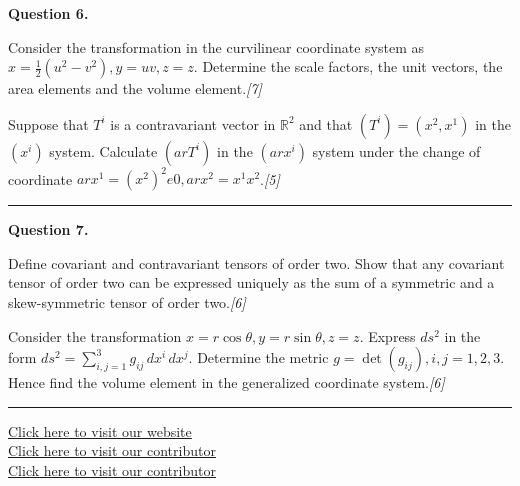 \documentclass[11pt,a4paper]{article}
\newcommand{\pts}[1]{\hfill   \textit{[#1]}}
\begin{document}
\medskip


\noindent   \textbf{Question 6.}

\begin{parts}
  \item Consider the transformation in the curvilinear coordinate system as $x = \frac{1}{2}(u^2-v^2), y=uv, z=z$. Determine the scale factors, the unit vectors, the area elements and the volume element.\pts{7}
  \item Suppose that $T^i$ is a contravariant vector in $\mathbb{R}^2$ and that $(T^i) = (x^2, x^1)$ in the $(x^i)$ system. Calculate $(ar{T}^i)$ in the $(ar{x}^i)$ system under the change of coordinate $ar{x}^1 = (x^2)^2 
e 0, ar{x}^2 = x^1 x^2$.\pts{5}
\end{parts}
\medskip\rule{\linewidth}{0.2pt}

\medskip


\noindent   \textbf{Question 7.}

\begin{parts}
  \item Define covariant and contravariant tensors of order two. Show that any covariant tensor of order two can be expressed uniquely as the sum of a symmetric and a skew-symmetric tensor of order two.\pts{6}
  \item Consider the transformation $x=r\cos \theta, y=r\sin \theta, z=z$. Express $ds^2$ in the form $ds^2 = \sum_{i,j=1}^3 g_{ij}\,dx^i\,dx^j$. Determine the metric $g = \det(g_{ij}), i,j=1,2,3$. Hence find the volume element in the generalized coordinate system.\pts{6}
\end{parts}

\vfill\rule{\linewidth}{0.4pt}

\begin{center}\small
\href{https://bhu-exam.vercel.app/}{Click here to visit our website}\\[4pt]
\href{https://me-aryan.vercel.app/}{Click here to visit our contributor}\\[4pt]
\href{https://quashan-me.vercel.app/}{Click here to visit our contributor}
\end{center}
\end{document}

